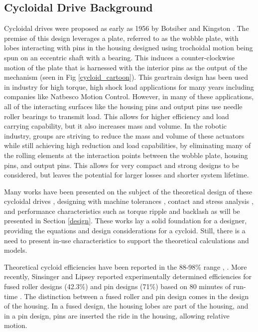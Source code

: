 \subsection{Cycloidal Drive Background}
Cycloidal drives were proposed as early as 1956 by Botsiber and Kingston \cite{1956}.
The premise of this design leverages a plate, referred to as the wobble plate, with lobes interacting with pins in the housing designed using trochoidal motion being spun on an eccentric shaft with a bearing.
This induces a counter-clockwise motion of the plate that is harnessed with the interior pins as the output of the mechanism (seen in Fig \ref{cycloid_cartoon}).
This geartrain design has been used in industry for high torque, high shock load applications for many years including companies like Natbesco Motion Control.
However, in many of these applications, all of the interacting surfaces like the housing pins and output pins use needle roller bearings to transmit load.
This allows for higher efficiency and load carrying capability, but it also increases mass and volume.
In the robotic industry, groups are striving to reduce the mass and volume of these actuators while still achieving  high reduction and load capabilities, by eliminating many of the rolling elements at the interaction points between the wobble plate, housing pins, and output pins.
This allows for very compact and strong designs to be considered, but leaves the potential for larger losses and shorter system lifetime.


Many works have been presented on the subject of the theoretical design of these cycloidal drives \cite{on_the_lobe} \cite{hwang_hsieh}, designing with machine tolerances \cite{design_and_application}, contact and stress analysis \cite{li}, and performance characteristics such as torque ripple and backlash \cite{hsieh_traditional} \cite{hsieh_dynamics} as will be presented in Section \ref{design}.
These works lay a solid foundation for a designer, providing the equations and design considerations for a cycloid.
Still, there is a need to present in-use characteristics to support the theoretical calculations and models.


Theoretical cycloid efficiencies have been reported in the 88-98\% range \cite{Malhorta}, \cite{unified_approach}.
More recently, Sinsinger and Lipsey reported experimentally determined efficiencies for fused roller designs (42.3\%) and pin designs (71\%) based on 80 minutes of run-time \cite{cycloid_vs_harmonic}.
The distinction between a fused roller and pin design comes in the design of the housing.
In a fused design, the housing lobes are part of the housing, and in a pin design, pins are inserted the ride in the housing, allowing relative motion.

